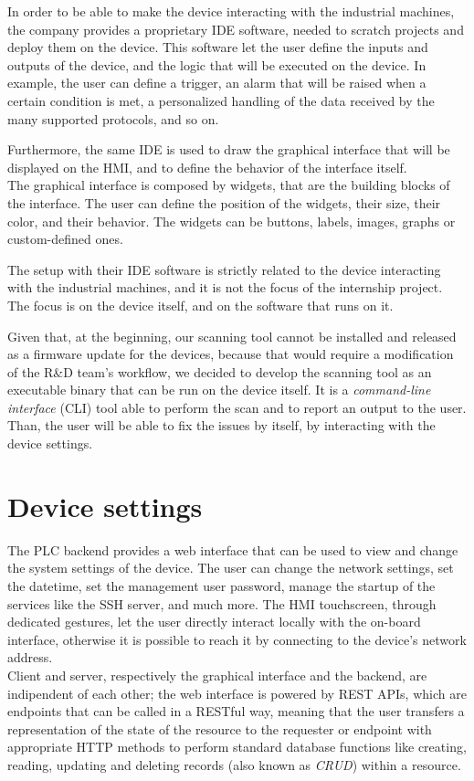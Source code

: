 In order to be able to make the device interacting with the industrial machines, the company provides a proprietary IDE software, needed to scratch projects and deploy them on the device. This software let the user define the inputs and outputs of the device, and the logic that will be executed on the device. In example, the user can define a trigger, an alarm that will be raised when a certain condition is met, a personalized handling of the data received by the many supported protocols, and so on.

Furthermore, the same IDE is used to draw the graphical interface that will be displayed on the HMI, and to define the behavior of the interface itself.\\
The graphical interface is composed by widgets, that are the building blocks of the interface. The user can define the position of the widgets, their size, their color, and their behavior. The widgets can be buttons, labels, images, graphs or custom-defined ones.

The setup with their IDE software is strictly related to the device interacting with the industrial machines, and it is not the focus of the internship project. The focus is on the device itself, and on the software that runs on it.

Given that, at the beginning, our scanning tool cannot be installed and released as a firmware update for the devices, because that would require a modification of the R\&D team's workflow, we decided to develop the scanning tool as an executable binary that can be run on the device itself. It is a \textit{command-line interface} (CLI) tool able to perform the scan and to report an output to the user. Than, the user will be able to fix the issues by itself, by interacting with the device settings.

\section{Device settings}

The PLC backend provides a web interface that can be used to view and change the system settings of the device. The user can change the network settings, set the datetime, set the management user password, manage the startup of the services like the SSH server, and much more. The HMI touchscreen, through dedicated gestures, let the user directly interact locally with the on-board interface, otherwise it is possible to reach it by connecting to the device's network address. \\
Client and server, respectively the graphical interface and the backend, are indipendent of each other; the web interface is powered by REST APIs, which are endpoints that can be called in a RESTful way, meaning that the user transfers a representation of the state of the resource to the requester or endpoint with appropriate HTTP methods to perform standard database functions like creating, reading, updating and deleting records (also known as \textit{CRUD}) within a resource.~\cite{rest-api}

